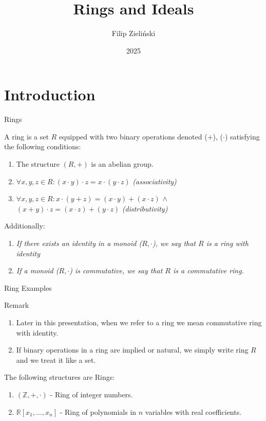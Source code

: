 \documentclass{beamer}
\title{Rings and Ideals}
\author{Filip Zieli\'nski}
\institute[Krakow]{University of the National Education Commission, Krakow.
}
\date{2025}
\begin{document}
\begin{frame}
\titlepage
\end{frame}
 
\section{Introduction}

\begin{frame}{Rings}
    \begin{definition}
        A \alert{ring} is a set $R$ equipped with two binary operations denoted (\textbf{$+$}), (\textbf{$\cdot$}) satisfying the following conditions:
        \begin{enumerate}
            \item  The structure $(R, +)$ is an abelian group.
            \item  $\forall x, y, z \in R : (x \cdot y) \cdot z = x \cdot (y \cdot z)$ \hfill \textit{(associativity)} 
            \item  $\forall x, y, z \in R : x \cdot (y + z) = (x \cdot y) + (x \cdot z)$ $\land$ \\
                  $(x + y) \cdot z = (x \cdot z) + (y \cdot z)$ \hfill \textit{(distributivity)} 
        \end{enumerate}
    \end{definition}
    \pause 
    Additionally:
    \begin{enumerate}
        \item \textit{If there exists an identity in a monoid ($R, \cdot$), we say that $R$ is a \alert{ring with identity}}
        \pause 
        \item \textit{If a monoid ($R, \cdot$) is commutative, we say that $R$ is a \alert{commutative ring}.}
    \end{enumerate}
\end{frame}
\begin{frame}{Ring Examples}
    \begin{alertblock}{Remark}
        \begin{enumerate}
            \item Later in this presentation, when we refer to a ring we mean commutative ring with identity.
            \item If binary operations in a ring are implied or natural, we simply write ring $R$ and we treat it like a set. 
        \end{enumerate}
    \end{alertblock}
    \pause
    \begin{example}
    The following structures are Rings:
    \begin{enumerate}
        \item $(\mathbb{Z}, +, \cdot)$ - Ring of integer numbers.   
        \pause 
        \item $\mathbb{R}\left[x_1,\ldots,x_n\right]$ - Ring of polynomials in $n$ variables with real coefficients.
    \end{enumerate}
     
    \end{example}
\end{frame}
\end{document}
